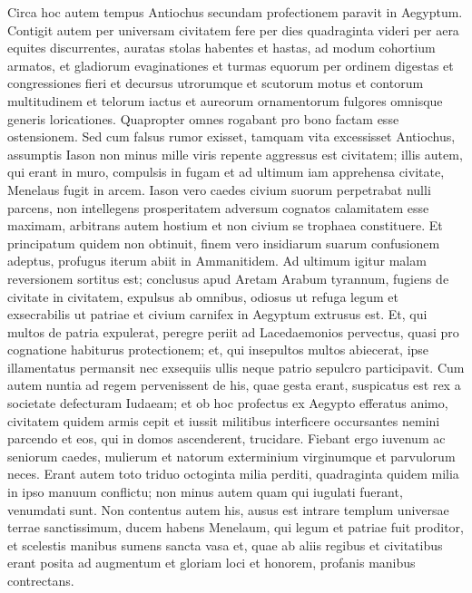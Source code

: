 \begin{biblechapter}  
\verse Circa hoc autem tempus Antiochus secundam profectionem paravit in Aegyptum. 
\verse Contigit autem per universam civitatem fere per dies quadraginta videri per aera equites discurrentes, auratas stolas habentes et hastas, ad modum cohortium armatos, et gladiorum evaginationes 
\verse et turmas equorum per ordinem digestas et congressiones fieri et decursus utrorumque et scutorum motus et contorum multitudinem et telorum iactus et aureorum ornamentorum fulgores omnisque generis loricationes. 
\verse Quapropter omnes rogabant pro bono factam esse ostensionem. 
\verse Sed cum falsus rumor exisset, tamquam vita excessisset Antiochus, assumptis Iason non minus mille viris repente aggressus est civitatem; illis autem, qui erant in muro, compulsis in fugam et ad ultimum iam apprehensa civitate, Menelaus fugit in arcem. 
\verse Iason vero caedes civium suorum perpetrabat nulli parcens, non intellegens prosperitatem adversum cognatos calamitatem esse maximam, arbitrans autem hostium et non civium se trophaea constituere. 
\verse Et principatum quidem non obtinuit, finem vero insidiarum suarum confusionem adeptus, profugus iterum abiit in Ammanitidem. 
\verse Ad ultimum igitur malam reversionem sortitus est; conclusus apud Aretam Arabum tyrannum, fugiens de civitate in civitatem, expulsus ab omnibus, odiosus ut refuga legum et exsecrabilis ut patriae et civium carnifex in Aegyptum extrusus est. 
\verse Et, qui multos de patria expulerat, peregre periit ad Lacedaemonios pervectus, quasi pro cognatione habiturus protectionem; 
\verse et, qui insepultos multos abiecerat, ipse illamentatus permansit nec exsequiis ullis neque patrio sepulcro participavit. 
\verse Cum autem nuntia ad regem pervenissent de his, quae gesta erant, suspicatus est rex a societate defecturam Iudaeam; et ob hoc profectus ex Aegypto efferatus animo, civitatem quidem armis cepit 
\verse et iussit militibus interficere occursantes nemini parcendo et eos, qui in domos ascenderent, trucidare. 
\verse Fiebant ergo iuvenum ac seniorum caedes, mulierum et natorum exterminium virginumque et parvulorum neces. 
\verse Erant autem toto triduo octoginta milia perditi, quadraginta quidem milia in ipso manuum conflictu; non minus autem quam qui iugulati fuerant, venumdati sunt. 
\verse Non contentus autem his, ausus est intrare templum universae terrae sanctissimum, ducem habens Menelaum, qui legum et patriae fuit proditor, 
\verse et scelestis manibus sumens sancta vasa et, quae ab aliis regibus et civitatibus erant posita ad augmentum et gloriam loci et honorem, profanis manibus contrectans. 

\end{biblechapter}
